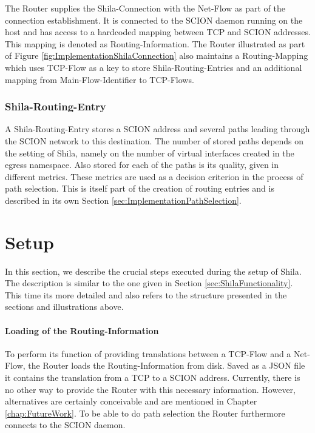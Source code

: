 The Router supplies the Shila-Connection with the Net-Flow as part of the connection establishment. It is connected to the SCION daemon running on the host and has access to a hardcoded mapping between TCP and SCION addresses. This mapping is denoted as Routing-Information. The Router illustrated as part of Figure \ref{fig:ImplementationShilaConnection} also maintains a Routing-Mapping which uses TCP-Flow as a key to store Shila-Routing-Entries and an additional mapping from Main-Flow-Identifier to TCP-Flows.

\subsubsection{Shila-Routing-Entry}

A Shila-Routing-Entry stores a SCION address and several paths leading through the SCION network to this destination. The number of stored paths depends on the setting of Shila, namely on the number of virtual interfaces created in the egress namespace. Also stored for each of the paths is its quality, given in different metrics. These metrics are used as a decision criterion in the process of path selection. This is itself part of the creation of routing entries and is described in its own Section \ref{sec:ImplementationPathSelection}.

\section{Setup}
\label{sec:ImplementationSetup}

In this section, we describe the crucial steps executed during the setup of Shila. The description is similar to the one given in Section \ref{sec:ShilaFunctionality}. This time its more detailed and also refers to the structure presented in the sections and illustrations above.

\paragraph{Loading of the Routing-Information}

To perform its function of providing translations between a TCP-Flow and a Net-Flow, the Router loads the Routing-Information from disk. Saved as a JSON file it contains the translation from a TCP to a SCION address. Currently, there is no other way to provide the Router with this necessary information. However, alternatives are certainly conceivable and are mentioned in Chapter \ref{chap:FutureWork}. To be able to do path selection the Router furthermore connects to the SCION daemon.

